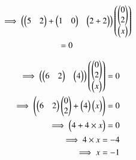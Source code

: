 \begin{enumerate}[label=\thesection.\arabic*.,ref=\thesection.\theenumi]
\begin{multline}
    \implies\myvec{\myvec{5&2}+\myvec{1&0}&\myvec{2+2}}\myvec{\myvec{0\\2}\\\myvec{x}}\\=0
\end{multline}
    
\begin{align}
    \implies \myvec{\myvec{6&2}&\myvec{4}}\myvec{\myvec{0\\2}\\\myvec{x}}=0
\\
    \implies \myvec{\myvec{6&2}\myvec{0\\2}+\myvec{4}\myvec{x}}=0
\\
    \implies \myvec{4+4\times x}=0
\\
    \implies 4\times x=-4
\\
    \implies x=-1
\end{align}
    


\end{enumerate}


